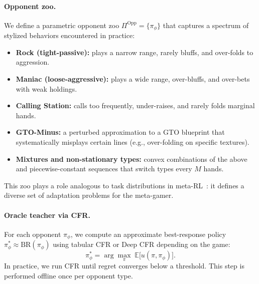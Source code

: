 \documentclass{article}
\begin{document}
\paragraph{Opponent zoo.}
We define a parametric opponent zoo $\Pi^{\text{Opp}} = \{\pi_{\phi}\}$ that captures a spectrum of stylized behaviors encountered in practice:
\begin{itemize}[leftmargin=*]
    \item \textbf{Rock (tight-passive):} plays a narrow range, rarely bluffs, and over-folds to aggression.
    \item \textbf{Maniac (loose-aggressive):} plays a wide range, over-bluffs, and over-bets with weak holdings.
    \item \textbf{Calling Station:} calls too frequently, under-raises, and rarely folds marginal hands.
    \item \textbf{GTO-Minus:} a perturbed approximation to a GTO blueprint that systematically misplays certain lines (e.g., over-folding on specific textures).
    \item \textbf{Mixtures and non-stationary types:} convex combinations of the above and piecewise-constant sequences that switch types every $M$ hands.
\end{itemize}
This zoo plays a role analogous to task distributions in meta-RL~\citep{duan2016rl2}: it defines a diverse set of adaptation problems for the meta-gamer.

\paragraph{Oracle teacher via CFR.}
For each opponent $\pi_{\phi}$, we compute an approximate best-response policy $\pi^*_{\phi} \approx \text{BR}(\pi_{\phi})$ using tabular CFR or Deep CFR depending on the game:
\begin{equation}
    \pi^*_{\phi} = \arg\max_{\pi} \; \mathbb{E}\big[ u(\pi, \pi_{\phi}) \big].
\end{equation}
In practice, we run CFR until regret converges below a threshold. This step is performed offline once per opponent type.
\end{document}
